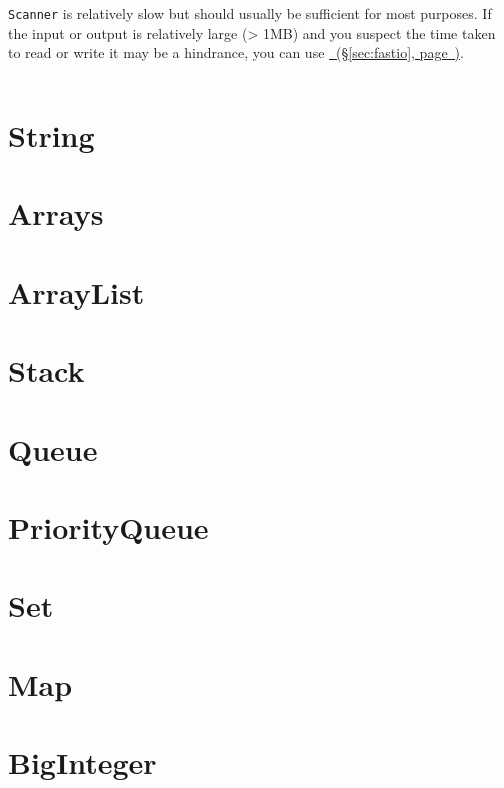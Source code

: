 \documentclass[10pt]{book}
\newcommand{\code}[1]{\inputminted[fontsize=\normalsize]{java}{code/#1}}
\newcommand*{\fulllink}[1]{\hyperref[{#1}]{\nameref*{#1}~(\S\ref*{#1}, page~\pageref*{#1})}}
\newif\iftodos
\newcommand{\todo}[1]{\iftodos\textcolor{red}{[TODO: #1]}\fi}
\begin{document}
\texttt{Scanner} is relatively slow but should usually be sufficient
for most purposes.  If the input or output is relatively large (> 1MB)
and you suspect the time taken to read or write it may be a hindrance,
you can use \fulllink{sec:fastio}.

\code{java/ScannerExample.java}

\section{String}

\section{Arrays}

\todo{Basic array template/examples.}

\section{ArrayList}

\section{Stack}

\todo{Stack class}

\section{Queue}

\todo{Queue interface, ArrayDeque class}

\section{PriorityQueue}

\todo{Note lack of decreaseKey operation (Dijkstra), use remove + add,
  not as fast}

\section{Set}

\todo{HashSet, TreeSet}

\section{Map}

\todo{HashMap, TreeMap}

\section{BigInteger} \label{sec:bigint}
\end{document}
